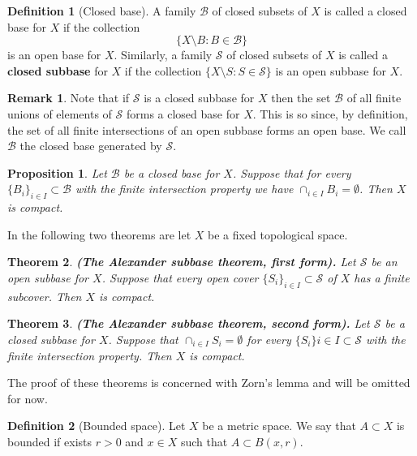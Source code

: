 \documentclass[11pt,a4paper]{article}
\theoremstyle{definition}
\newtheorem{definition}{Definition}[section]
\newtheorem{remark}{Remark}[section]
\theoremstyle{plain}
\newtheorem{theorem}{Theorem}[section]
\newtheorem{proposition}[theorem]{Proposition}
\renewcommand{\tt}[1]{\textnormal{\textbf{(#1).}}} %
\begin{document}
  \begin{definition}[Closed base]
    A family $\mathcal{B}$ of closed subsets of $X$ is called a 
    closed base for $X$ if the collection
    \[
      \{X \setminus B \colon B \in \mathcal{B}\}
    \]
    is an open base for $X$. Similarly, a family $\mathcal{S}$ of
    closed subsets of $X$ is called a \textbf{closed subbase} for $X$ 
    if the collection $\{X \setminus S \colon S \in \mathcal{S}\}$ is 
    an open subbase for $X$.
  \end{definition}

  \begin{remark}
    Note that if $\mathcal{S}$ is a closed subbase for $X$ then the set 
    $\mathcal{B}$ of all finite unions of elements of $\mathcal{S}$ forms 
    a closed base for $X$. This is so since, by definition,
    the set of all finite intersections of an open subbase forms an open 
    base. We call $\mathcal{B}$ the closed base generated by 
    $\mathcal{S}$.
  \end{remark}

  \begin{proposition}
    Let $\mathcal{B}$ be a closed base for $X$. Suppose that for every 
    $\{B_i\}_{i \in I} \subset \mathcal{B}$ with the finite intersection 
    property we have $\cap_{i \in I}{B_i} = \emptyset$. Then $X$ is 
    compact.
  \end{proposition}

  In the following two theorems are let $X$ be a fixed topological space.

  \begin{theorem}
    \tt{The Alexander subbase theorem, first form}
    Let $\mathcal{S}$ be an open subbase for $X$. Suppose that every 
    open cover $\{S_i\}_{i \in I} \subset \mathcal{S}$ of $X$ has a 
    finite subcover. Then $X$ is compact.
  \end{theorem}

  \begin{theorem}
    \tt{The Alexander subbase theorem, second form}
    Let $\mathcal{S}$ be a closed subbase for $X$. Suppose that 
    $\cap_{i \in I}{S_i} = \emptyset$ for every 
    $\{S_i\}{i \in I} \subset \mathcal{S}$ with the finite intersection 
    property. Then $X$ is compact.
  \end{theorem}

  The proof of these theorems is concerned with Zorn's lemma and will
  be omitted for now.
  
  \begin{definition}[Bounded space]
    Let $X$ be a metric space. We say that $A \subset X$ is 
    bounded if exists $r > 0$ and $x \in X$ such that $A \subset B(x,r)$.
  \end{definition}
\end{document}
